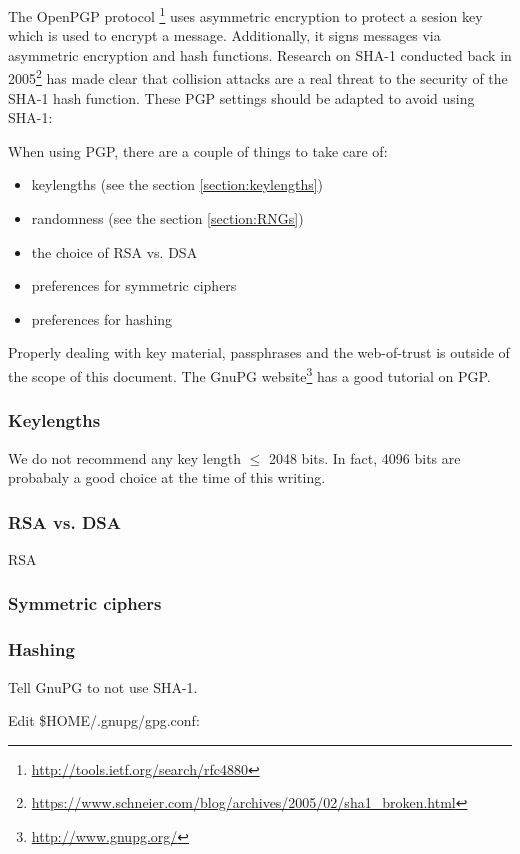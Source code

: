 
The OpenPGP protocol
\footnote{\url{http://tools.ietf.org/search/rfc4880}}
 uses asymmetric encryption to protect a sesion key which is used to encrypt a message. Additionally, it signs messages via asymmetric encryption and hash functions. %
Research on SHA-1 conducted back in 2005\footnote{\url{https://www.schneier.com/blog/archives/2005/02/sha1\_broken.html}} has made clear that collision attacks are a real threat to the security of the SHA-1 hash function. These PGP settings should be adapted to avoid using SHA-1: 

When using PGP, there are a couple of things to take care of:
\begin{itemize}
\item keylengths (see the section \ref{section:keylengths})
\item randomness (see the section \ref{section:RNGs})
\item the choice of RSA vs. DSA 
\item preferences for symmetric ciphers
\item preferences for hashing
\end{itemize}

Properly dealing with key material, passphrases and the web-of-trust is outside of the scope of this document. The GnuPG website\footnote{\url{http://www.gnupg.org/}} has a good tutorial on PGP.

\subsubsection{Keylengths}
We do not recommend any key length $\le$ 2048 bits. In fact, 4096 bits are probabaly a good choice at the time of this writing.

\subsubsection{RSA vs. DSA}
RSA%

\subsubsection{Symmetric ciphers}


\subsubsection{Hashing}
Tell GnuPG to not use SHA-1.

Edit \$HOME/.gnupg/gpg.conf:

